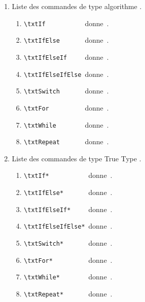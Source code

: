 \documentclass[12pt,a4paper]{article}
\theoremstyle{definition}
\begin{document}
\begin{enumerate}

    \item Liste des commandes de type \og algorithme \fg{}.

    \begin{enumerate}[label=\alph*)]
        \item \verb#\txtIf          # \,donne\, \txtIf.
        \item \verb#\txtIfElse      # \,donne\, \txtIfElse.
        \item \verb#\txtIfElseIf    # \,donne\, \txtIfElseIf.
        \item \verb#\txtIfElseIfElse# \,donne\, \txtIfElseIfElse.
        \item \verb#\txtSwitch      # \,donne\, \txtSwitch.
    \smallskip
        \item \verb#\txtFor         # \,donne\, \txtFor.
        \item \verb#\txtWhile       # \,donne\, \txtWhile.
        \item \verb#\txtRepeat      # \,donne\, \txtRepeat.
    \end{enumerate}

    \item Liste des commandes de type \og True Type \fg{}.

    \begin{enumerate}[label=\alph*)]
        \item \verb#\txtIf*          # \,donne\, \txtIf*.
        \item \verb#\txtIfElse*      # \,donne\, \txtIfElse*.
        \item \verb#\txtIfElseIf*    # \,donne\, \txtIfElseIf*.
        \item \verb#\txtIfElseIfElse*# \,donne\, \txtIfElseIfElse*.
        \item \verb#\txtSwitch*      # \,donne\, \txtSwitch*.
    \smallskip
        \item \verb#\txtFor*         # \,donne\, \txtFor*.
        \item \verb#\txtWhile*       # \,donne\, \txtWhile*.
        \item \verb#\txtRepeat*      # \,donne\, \txtRepeat*.
    \end{enumerate}
\end{enumerate}

\end{document}
